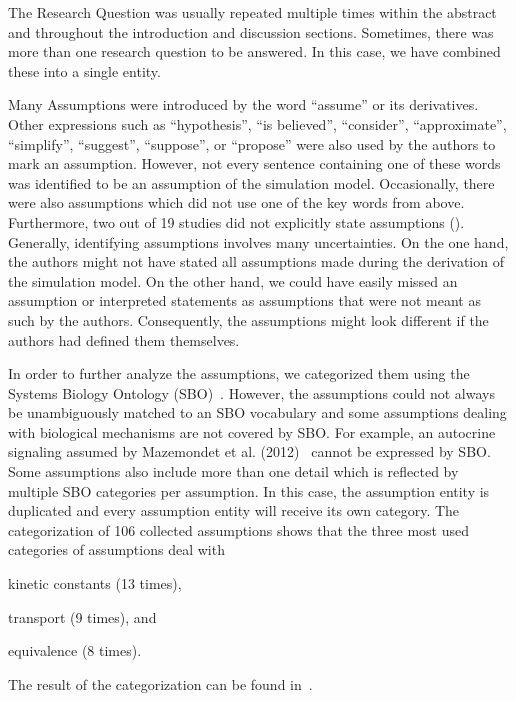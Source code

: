 \documentclass[10pt,letterpaper]{article}
\newcommand{\RQ}{Research Question}
\newcommand{\As}{Assumptions}
\begin{document}

The \RQ{} was usually repeated multiple times within the abstract and throughout the introduction and discussion sections.
Sometimes, there was more than one research question to be answered.
In this case, we have combined these into a single entity.

Many \As{} were introduced by the word \enquote{assume} or its derivatives.
Other expressions such as \enquote{hypothesis}, \enquote{is believed}, \enquote{consider}, \enquote{approximate}, \enquote{simplify}, \enquote{suggest}, \enquote{suppose}, or \enquote{propose} were also used by the authors to mark an assumption.
However, not every sentence containing one of these words was identified to be an assumption of the simulation model.
Occasionally, there were also assumptions which did not use one of the key words from above.
Furthermore, two out of 19 studies did not explicitly state assumptions (\cite{Kruger2004, Padala2017}).
Generally, identifying assumptions involves many uncertainties.
On the one hand, the authors might not have stated all assumptions made during the derivation of the simulation model.
On the other hand, we could have easily missed an assumption or interpreted statements as assumptions that were not meant as such by the authors.
Consequently, the assumptions might look different if the authors had defined them themselves.

In order to further analyze the assumptions, we categorized them using the Systems Biology Ontology (SBO)~\cite{Courtot2011}.
However, the assumptions could not always be unambiguously matched to an SBO vocabulary and some assumptions dealing with biological mechanisms are not covered by SBO.
For example, an autocrine signaling assumed by Mazemondet et al. (2012)~\cite{Mazemondet2012} cannot be expressed by SBO.
Some assumptions also include more than one detail which is reflected by multiple SBO categories per assumption.
In this case, the assumption entity is duplicated and every assumption entity will receive its own category.
The categorization of 106 collected assumptions shows that the three most used categories of assumptions deal with
\begin{inparaenum}
\item[] kinetic constants (13 times),
\item[] transport (9 times), and
\item[] equivalence (8 times).
\end{inparaenum}
The result of the categorization can be found in~.
\end{document}
